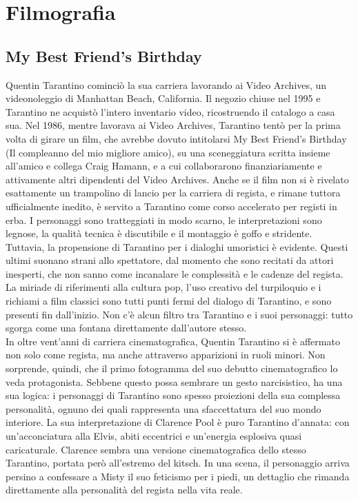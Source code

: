 \documentclass[12pt]{article} %
\begin{document}
\section{Filmografia}
\subsection{My Best Friend's Birthday}
\begin{flushleft}
Quentin Tarantino cominciò la sua carriera lavorando ai Video Archives, un videonoleggio di Manhattan Beach, California. Il negozio chiuse nel 1995 e Tarantino ne acquistò l'intero inventario video, ricostruendo il catalogo a casa sua. Nel 1986, mentre lavorava ai Video Archives, Tarantino tentò per la prima volta di girare un film, che avrebbe dovuto intitolarsi My Best Friend's Birthday (Il compleanno del mio migliore amico), su una sceneggiatura scritta insieme all'amico e collega Craig Hamann, e a cui collaborarono finanziariamente e attivamente altri dipendenti del Video Archives. Anche se il film non si è rivelato esattamente un trampolino di lancio per la carriera di regista, e rimane tuttora ufficialmente inedito, è servito a Tarantino come corso accelerato per registi in erba.
I personaggi sono tratteggiati in modo scarno, le interpretazioni sono legnose, la qualità tecnica è discutibile e il montaggio è goffo e stridente.  Tuttavia, la propensione di Tarantino per i dialoghi umoristici è evidente. Questi ultimi suonano strani allo spettatore, dal momento che sono recitati da attori inesperti, che non sanno come incanalare le complessità e le cadenze del regista.  La miriade di riferimenti alla cultura pop, l'uso creativo del turpiloquio e i richiami a film classici sono tutti punti fermi del dialogo di Tarantino, e sono presenti fin dall'inizio.  Non c'è alcun filtro tra Tarantino e i suoi personaggi: tutto sgorga come una fontana direttamente dall'autore stesso. \\\vspace{1cm}
In oltre vent'anni di carriera cinematografica, Quentin Tarantino si è affermato non solo come regista, ma anche attraverso apparizioni in ruoli minori. Non sorprende, quindi, che il primo fotogramma del suo debutto cinematografico lo veda protagonista. Sebbene questo possa sembrare un gesto narcisistico, ha una sua logica: i personaggi di Tarantino sono spesso proiezioni della sua complessa personalità, ognuno dei quali rappresenta una sfaccettatura del suo mondo interiore.
La sua interpretazione di Clarence Pool è puro Tarantino d’annata: con un'acconciatura alla Elvis, abiti eccentrici e un’energia esplosiva quasi caricaturale. Clarence sembra una versione cinematografica dello stesso Tarantino, portata però all’estremo del kitsch. In una scena, il personaggio arriva persino a confessare a Misty il suo feticismo per i piedi, un dettaglio che rimanda direttamente alla personalità del regista nella vita reale.\\\vspace{1cm}

\end{flushleft}
\end{document}

